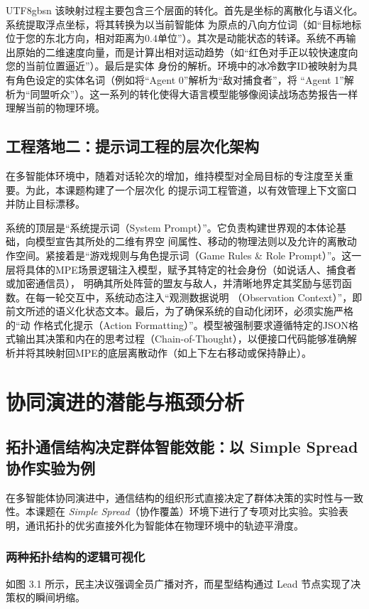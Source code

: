 \documentclass[11pt,a4paper]{article}
\begin{document}
\begin{CJK*}{UTF8}{gbsn}
该映射过程主要包含三个层面的转化。首先是坐标的离散化与语义化。系统提取浮点坐标，将其转换为以当前智能体
为原点的八向方位词（如“目标地标位于您的东北方向，相对距离为0.4单位”）。其次是动能状态的转译。系统不再输
出原始的二维速度向量，而是计算出相对运动趋势（如“红色对手正以较快速度向您的当前位置逼近”）。最后是实体
身份的解析。环境中的冰冷数字ID被映射为具有角色设定的实体名词（例如将“Agent 0”解析为“敌对捕食者”，将
“Agent 1”解析为“同盟听众”）。这一系列的转化使得大语言模型能够像阅读战场态势报告一样理解当前的物理环境。

\subsection{工程落地二：提示词工程的层次化架构} 
在多智能体环境中，随着对话轮次的增加，维持模型对全局目标的专注度至关重要。为此，本课题构建了一个层次化
的提示词工程管道，以有效管理上下文窗口并防止目标漂移。  

系统的顶层是“系统提示词（System Prompt）”。它负责构建世界观的本体论基础，向模型宣告其所处的二维有界空
间属性、移动的物理法则以及允许的离散动作空间。紧接着是“游戏规则与角色提示词（Game Rules \& Role 
Prompt）”。这一层将具体的MPE场景逻辑注入模型，赋予其特定的社会身份（如说话人、捕食者或加密通信员），
明确其所处阵营的盟友与敌人，并清晰地界定其奖励与惩罚函数。在每一轮交互中，系统动态注入“观测数据说明
（Observation Context）”，即前文所述的语义化状态文本。最后，为了确保系统的自动化闭环，必须实施严格的“动
作格式化提示（Action Formatting）”。模型被强制要求遵循特定的JSON格式输出其决策和内在的思考过程（Chain-of-Thought），以便接口代码能够准确解析并将其映射回MPE的底层离散动作（如上下左右移动或保持静止）。
\newpage 

\section{协同演进的潜能与瓶颈分析}

\subsection{拓扑通信结构决定群体智能效能：以 Simple Spread 协作实验为例}
在多智能体协同演进中，通信结构的组织形式直接决定了群体决策的实时性与一致性。本课题在 \textit{Simple Spread}（协作覆盖）环境下进行了专项对比实验。实验表明，通讯拓扑的优劣直接外化为智能体在物理环境中的轨迹平滑度。

\subsubsection{两种拓扑结构的逻辑可视化}
如图 3.1 所示，民主决议强调全员广播对齐，而星型结构通过 Lead 节点实现了决策权的瞬间坍缩。


\end{CJK*}
\end{document}

